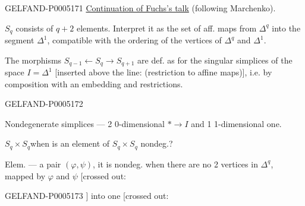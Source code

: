 \begin{GelfandAdjacentEvidence}{GELFAND-P000517}{1}
\uline{Continuation of Fuchs’s talk} (following Marchenko).


$S_q$ consists of $q+2$ elements. Interpret it as the set of aff. maps from
$\Delta^q$ into the segment $\Delta^1$, compatible with the ordering of the vertices of $\Delta^q$ and $\Delta^1$.

The morphisms $S_{q-1}\leftarrow S_q\to S_{q+1}$ are def. as for the singular simplices of the space
$I=\Delta^1$ [inserted above the line: (restriction to affine maps)], i.e. by composition with an embedding and restrictions.
\end{GelfandAdjacentEvidence}
\begin{GelfandAdjacentEvidence}{GELFAND-P000517}{2}


Nondegenerate simplices — 2 0-dimensional $*\to I$ and 1 1-dimensional one.

$S_q\times S_q$\qquad when is an element of $S_q\times S_q$ nondeg.?

Elem. — a pair $(\varphi,\psi)$, it is nondeg. when there are no 2 vertices in $\Delta^q$,
mapped by $\varphi$ and $\psi$ [crossed out:
\end{GelfandAdjacentEvidence}
\begin{GelfandAdjacentEvidence}{GELFAND-P000517}{3}
]
into one [crossed out:
\end{GelfandAdjacentEvidence}
